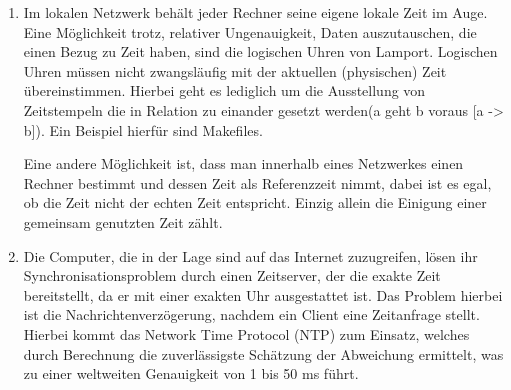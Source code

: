 \documentclass[a4paper]{scrartcl}
\begin{document}
	\renewcommand{\labelenumi}{\alph{enumi})}
	\begin{enumerate}
		\item Im lokalen Netzwerk behält jeder Rechner seine eigene lokale Zeit im Auge. Eine Möglichkeit trotz, relativer Ungenauigkeit, Daten auszutauschen, die einen Bezug zu Zeit haben, sind die logischen Uhren von Lamport. Logischen Uhren müssen nicht zwangsläufig mit der aktuellen (physischen) Zeit übereinstimmen. Hierbei geht es lediglich um die Ausstellung von Zeitstempeln die in Relation zu einander gesetzt werden(a geht b voraus [a -> b]). Ein Beispiel hierfür sind Makefiles.

Eine andere Möglichkeit ist, dass man innerhalb eines Netzwerkes einen Rechner bestimmt und dessen Zeit als Referenzzeit nimmt, dabei ist es egal, ob die Zeit nicht der echten Zeit entspricht. Einzig allein die Einigung einer gemeinsam genutzten Zeit zählt.

		\item Die Computer, die in der Lage sind auf das Internet zuzugreifen, lösen ihr Synchronisationsproblem durch einen Zeitserver, der die exakte Zeit bereitstellt, da er mit einer exakten Uhr ausgestattet ist. Das Problem hierbei ist die Nachrichtenverzögerung, nachdem ein Client eine Zeitanfrage stellt. Hierbei kommt das Network Time Protocol (NTP) zum Einsatz, welches durch Berechnung die zuverlässigste Schätzung der Abweichung ermittelt, was zu einer weltweiten Genauigkeit von 1 bis 50 ms führt.
	\end{enumerate}
\end{document}
